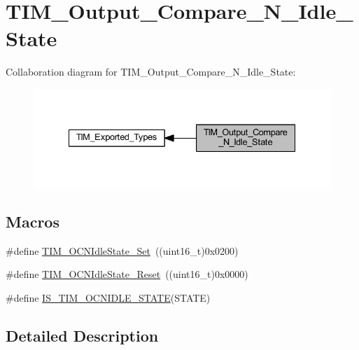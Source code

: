 \hypertarget{group___t_i_m___output___compare___n___idle___state}{}\section{T\+I\+M\+\_\+\+Output\+\_\+\+Compare\+\_\+\+N\+\_\+\+Idle\+\_\+\+State}
\label{group___t_i_m___output___compare___n___idle___state}
Collaboration diagram for T\+I\+M\+\_\+\+Output\+\_\+\+Compare\+\_\+\+N\+\_\+\+Idle\+\_\+\+State\+:
\nopagebreak
\begin{figure}[H]
\begin{center}
\leavevmode
\includegraphics[width=335pt]{group___t_i_m___output___compare___n___idle___state}
\end{center}
\end{figure}
\subsection*{Macros}
\begin{DoxyCompactItemize}
\item 
\#define \hyperlink{group___t_i_m___output___compare___n___idle___state_ga980392da6eb5bedcbf7ed353e1073f99}{T\+I\+M\+\_\+\+O\+C\+N\+Idle\+State\+\_\+\+Set}~((uint16\+\_\+t)0x0200)
\item 
\#define \hyperlink{group___t_i_m___output___compare___n___idle___state_ga329a32820cdba0af9c4b7a04177e8fdd}{T\+I\+M\+\_\+\+O\+C\+N\+Idle\+State\+\_\+\+Reset}~((uint16\+\_\+t)0x0000)
\item 
\#define \hyperlink{group___t_i_m___output___compare___n___idle___state_ga0987091d1d03ba2db065efb66eff3951}{I\+S\+\_\+\+T\+I\+M\+\_\+\+O\+C\+N\+I\+D\+L\+E\+\_\+\+S\+T\+A\+TE}(S\+T\+A\+TE)
\end{DoxyCompactItemize}


\subsection{Detailed Description}


